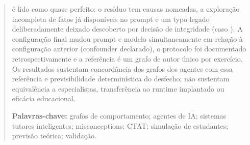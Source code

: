 \documentclass[11pt,a4paper]{article}
\begin{document}
\begin{abstract}
é lido como quase perfeito: o resíduo tem causas nomeadas, a exploração incompleta de fatos já disponíveis no prompt e um typo legado deliberadamente deixado descoberto por decisão de integridade (caso ). A configuração final mudou prompt e modelo simultaneamente em relação à configuração anterior (confounder declarado), o protocolo foi documentado retrospectivamente e a referência é um grafo de autor único por exercício. Os resultados sustentam concordância dos grafos dos agentes com essa referência e previsibilidade determinística do desfecho; não sustentam equivalência a especialistas, transferência ao runtime implantado ou eficácia educacional.

\smallskip\noindent\textbf{Palavras-chave:} grafos de comportamento; agentes de IA; sistemas tutores inteligentes; misconceptions; CTAT; simulação de estudantes; previsão teórica; validação.
\end{abstract}
\end{document}
